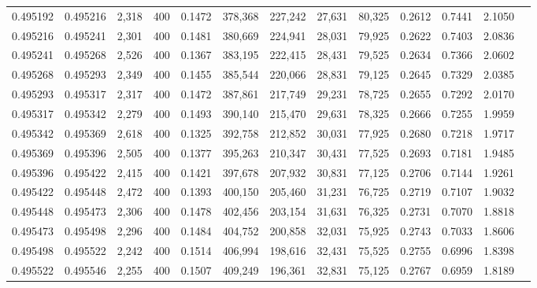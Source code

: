 \begin{tabular}{rrrrrrrrrrrrr}
0.495192 & 0.495216 &  2,318 & 400 &                                     0.1472 & 378,368 & 227,242 &  27,631 &  80,325 & 0.2612 & 0.7441 & 2.1050 \\
0.495216 & 0.495241 &  2,301 & 400 &                                     0.1481 & 380,669 & 224,941 &  28,031 &  79,925 & 0.2622 & 0.7403 & 2.0836 \\
0.495241 & 0.495268 &  2,526 & 400 &                                     0.1367 & 383,195 & 222,415 &  28,431 &  79,525 & 0.2634 & 0.7366 & 2.0602 \\
0.495268 & 0.495293 &  2,349 & 400 &                                     0.1455 & 385,544 & 220,066 &  28,831 &  79,125 & 0.2645 & 0.7329 & 2.0385 \\
0.495293 & 0.495317 &  2,317 & 400 &                                     0.1472 & 387,861 & 217,749 &  29,231 &  78,725 & 0.2655 & 0.7292 & 2.0170 \\
0.495317 & 0.495342 &  2,279 & 400 &                                     0.1493 & 390,140 & 215,470 &  29,631 &  78,325 & 0.2666 & 0.7255 & 1.9959 \\
0.495342 & 0.495369 &  2,618 & 400 &                                     0.1325 & 392,758 & 212,852 &  30,031 &  77,925 & 0.2680 & 0.7218 & 1.9717 \\
0.495369 & 0.495396 &  2,505 & 400 &                                     0.1377 & 395,263 & 210,347 &  30,431 &  77,525 & 0.2693 & 0.7181 & 1.9485 \\
0.495396 & 0.495422 &  2,415 & 400 &                                     0.1421 & 397,678 & 207,932 &  30,831 &  77,125 & 0.2706 & 0.7144 & 1.9261 \\
0.495422 & 0.495448 &  2,472 & 400 &                                     0.1393 & 400,150 & 205,460 &  31,231 &  76,725 & 0.2719 & 0.7107 & 1.9032 \\
0.495448 & 0.495473 &  2,306 & 400 &                                     0.1478 & 402,456 & 203,154 &  31,631 &  76,325 & 0.2731 & 0.7070 & 1.8818 \\
0.495473 & 0.495498 &  2,296 & 400 &                                     0.1484 & 404,752 & 200,858 &  32,031 &  75,925 & 0.2743 & 0.7033 & 1.8606 \\
0.495498 & 0.495522 &  2,242 & 400 &                                     0.1514 & 406,994 & 198,616 &  32,431 &  75,525 & 0.2755 & 0.6996 & 1.8398 \\
0.495522 & 0.495546 &  2,255 & 400 &                                     0.1507 & 409,249 & 196,361 &  32,831 &  75,125 & 0.2767 & 0.6959 & 1.8189 \\

\end{tabular}
